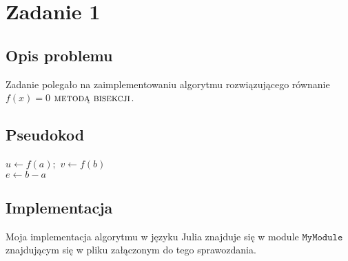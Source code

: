 \section{Zadanie 1}
\subsection{Opis problemu}
Zadanie polegało na zaimplementowaniu algorytmu rozwiązującego równanie $ f(x) = 0 $ $\textsc{metodą bisekcji} $.
\subsection{Pseudokod}
\begin{algorithm}[H]
  $u \leftarrow f(a);$ $ v \leftarrow f(b) $ \\
  $e \leftarrow b - a $ \\
\end{algorithm}
\subsection{Implementacja}
Moja implementacja algorytmu w języku Julia znajduje się w module $ \texttt{MyModule} $ znajdującym się w pliku załączonym do tego sprawozdania.